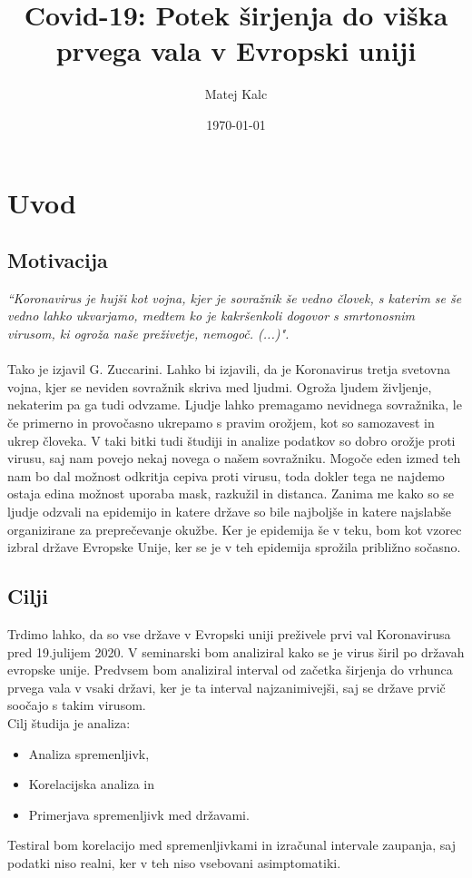 \documentclass[a4paper,11pt]{article}
\title{Covid-19: Potek širjenja do viška prvega vala v Evropski uniji}
\author{Matej Kalc} %
\date{\today}
\begin{document}
\maketitle

\section{Uvod}
\subsection{Motivacija}


\emph{“Koronavirus je hujši kot vojna, kjer je sovražnik še vedno človek, s katerim se še
vedno lahko ukvarjamo, medtem ko je kakršenkoli dogovor s smrtonosnim virusom,
ki ogroža naše preživetje, nemogoč. (...)".} \cite{zucc}\\ \\
Tako je izjavil G. Zuccarini. Lahko bi izjavili, da je Koronavirus tretja svetovna vojna, kjer se neviden sovražnik skriva med ljudmi. Ogroža ljudem življenje, nekaterim pa ga tudi odvzame. Ljudje lahko premagamo nevidnega sovražnika, le če primerno in provočasno ukrepamo s pravim orožjem, kot so samozavest in ukrep človeka. V taki bitki tudi študiji in analize podatkov so dobro orožje proti virusu, saj nam povejo nekaj novega o našem sovražniku. Mogoče eden izmed teh nam bo dal možnost odkritja cepiva proti virusu, toda dokler tega ne najdemo ostaja edina možnost uporaba mask, razkužil in distanca. Zanima me kako so se ljudje odzvali na epidemijo in katere države so bile najboljše in katere najslabše organizirane za preprečevanje okužbe. Ker je epidemija še v teku, bom kot vzorec izbral države Evropske Unije, ker se je v teh epidemija sprožila približno sočasno. 


\subsection{Cilji}
Trdimo lahko, da so vse države v Evropski uniji \cite{eu} preživele prvi val Koronavirusa pred 19.julijem 2020. V seminarski bom analiziral kako se je virus širil po državah evropske unije. Predvsem bom analiziral interval od začetka širjenja do vrhunca prvega vala v vsaki državi, ker je ta interval najzanimivejši, saj se države prvič soočajo s takim virusom. \\
Cilj študija je analiza:
\begin{itemize}
\item{Analiza spremenljivk,}
\item{Korelacijska analiza in}
\item{Primerjava spremenljivk med državami.}
\end{itemize}
Testiral bom korelacijo med spremenljivkami in izračunal intervale zaupanja, saj podatki niso realni, ker v teh niso vsebovani asimptomatiki.
\end{document}
